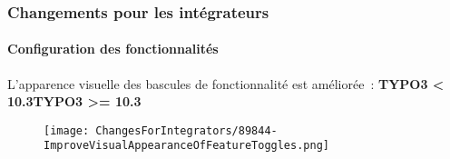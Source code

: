 
\begin{frame}[fragile]
	\frametitle{Changements pour les intégrateurs}
	\framesubtitle{Configuration des fonctionnalités}

	L'apparence visuelle des bascules de fonctionnalité est améliorée~:
	\newline\newline
	\smaller\textbf{TYPO3 < 10.3}\tabto{6cm}\textbf{TYPO3 >= 10.3}\normalsize

	\begin{figure}
		\texttt{[image: ChangesForIntegrators/89844-ImproveVisualAppearanceOfFeatureToggles.png]}
	\end{figure}

\end{frame}

%
%
%
%
%
%
%
